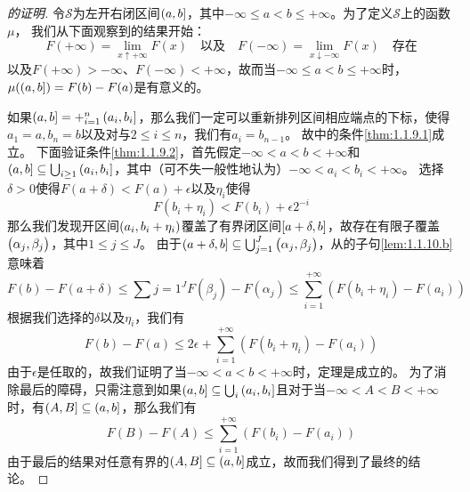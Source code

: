 \documentclass[../main.tex]{subfiles}
\begin{document}
\begin{proof}[的证明]
	令\(\mathcal{S}\)为左开右闭区间\(\intoc{a,b}\)，其中\(-\infty \leq a < b \leq +\infty\)。为了定义\(\mathcal{S}\)上的函数\(\mu\)，
	我们从下面观察到的结果开始：
	\[F(+\infty) = \lim\limits_{x \uparrow +\infty} F(x)\quad \text{以及}\quad
	F(-\infty) = \lim\limits_{x \downarrow -\infty} F(x)\quad\text{存在}\]
	以及\(F(+\infty) > -\infty\)、\(F(-\infty) < +\infty\)，故而当\(-\infty \leq a < b \leq +\infty\)时，\(\mu(\intoc{a, b}) = F(b) - F(a)\)是有意义的。

	如果\(\intoc{a, b} = +_{i=1}^{n}\intoc{a_i, b_i}\)，那么我们一定可以重新排列区间相应端点的下标，使得\(a_1 = a, b_n = b\)以及对与\(2 \leq i \leq n\)，我们有\(a_i = b_{n-1}\)。
	故中的条件\ref{thm:1.1.9.1}成立。
	下面验证条件\ref{thm:1.1.9.2}，首先假定\(-\infty < a < b < +\infty\)和\(\intoc{a, b} \subseteq \bigcup_{i \geq 1} \intoc{a_i, b_i}\)，其中（可不失一般性地认为）\(-\infty < a_i < b_i < +\infty\)。
	选择\(\delta > 0\)使得\(F(a + \delta) < F(a) + \epsilon\)以及\(\eta_i\)使得
	\[F(b_i + \eta_i) < F(b_i) + \epsilon 2^{-i}\]
	那么我们发现开区间\(\intoo{a_i, b_i + \eta_i}\)覆盖了有界闭区间\(\intcc{a + \delta, b}\)，故存在有限子覆盖\(\intoo{\alpha_j, \beta_j}\)，其中\(1 \leq j \leq J\)。
	由于\(\intoc{a + \delta, b} \subseteq \bigcup_{j=1}^J \intoo{\alpha_j, \beta_j}\)，从的子句\ref{lem:1.1.10.b}意味着
	\[F(b) - F(a+\delta) \leq \sum{j=1}^J F(\beta_j) - F(\alpha_j) \leq \sum_{i=1}^{+\infty}(F(b_i+\eta_i) - F(a_i))\]
	根据我们选择的\(\delta\)以及\(\eta_i\)，我们有
	\[F(b) - F(a) \leq 2\epsilon + \sum_{i=1}^{+\infty}(F(b_i+\eta_i) - F(a_i))\]
	由于\(\epsilon\)是任取的，故我们证明了当\(-\infty < a < b < +\infty\)时，定理是成立的。
	为了消除最后的障碍，只需注意到如果\(\intoc{a, b} \subseteq \bigcup_i \intoc{a_i, b_i}\)且对于当\(-\infty < A < B < +\infty\)时，有\(\intoc{A, B} \subseteq \intoc{a, b}\)，那么我们有
	\[F(B) - F(A) \leq \sum_{i=1}^{+\infty} (F(b_i) - F(a_i))\]
	由于最后的结果对任意有界的\(\intoc{A, B} \subseteq \intoc{a, b}\)成立，故而我们得到了最终的结论。
\end{proof}
\end{document}

